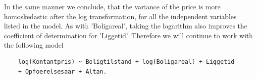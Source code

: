 In the same manner we conclude, that the variance of the price is more homoskedastic after the log transformation, for all the independent variables listed in the model.
As with 'Boligareal', taking the logarithm also improves the coefficient of determination for 'Liggetid'. 
Therefore we will continue to work with the following model
\begin{lstlisting}
    log(Kontantpris) ~ Boligtilstand + log(Boligareal) + Liggetid
    + Opfoerelsesaar + Altan.
\end{lstlisting}